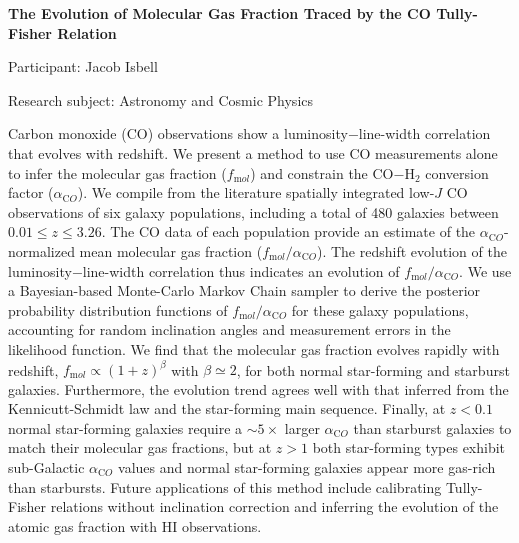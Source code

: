 \begin{minipage}[t]{1.0\textwidth}

\begin{center}

{{\large\bfseries The Evolution of Molecular Gas Fraction Traced by the CO Tully-Fisher Relation}\par}

\end{center}

{\noindent Participant: Jacob Isbell\par} 

{\noindent Research subject: Astronomy and Cosmic Physics\par}\medskip

\noindent Carbon monoxide (CO) observations show a luminosity$-$line-width correlation that evolves with redshift. We present a method to use CO measurements alone to infer the molecular gas fraction ($f_{\mathrm mol}$) and constrain the CO$-$H$_2$ conversion factor ($\alpha_{\mathrm CO}$). We compile from the literature spatially integrated low-$J$ CO observations of six galaxy populations, including a total of 480 galaxies between $0.01 \leq z \leq 3.26$. The CO data of each population provide an estimate of the $\alpha_{\mathrm CO}$-normalized mean molecular gas fraction ($f_{\mathrm mol}/\alpha_{\mathrm CO}$). The redshift evolution of the luminosity$-$line-width correlation thus indicates an evolution of $f_{\mathrm mol}/\alpha_{\mathrm CO}$. We use a Bayesian-based Monte-Carlo Markov Chain sampler to derive the posterior probability distribution functions of $f_{\mathrm mol}/\alpha_{\mathrm CO}$ for these galaxy populations, accounting for random inclination angles and measurement errors in the likelihood function. We find that the molecular gas fraction evolves rapidly with redshift, $f_{\mathrm mol} \propto (1+z)^\beta$ with $\beta \simeq 2$, for both normal star-forming and starburst galaxies. Furthermore, the evolution trend agrees well with that inferred from the Kennicutt-Schmidt law and the star-forming main sequence. Finally, at $z < 0.1$ normal star-forming galaxies require a $\sim5\times$ larger $\alpha_{\mathrm CO}$ than starburst galaxies to match their molecular gas fractions, but at $z > 1$ both star-forming types exhibit sub-Galactic $\alpha_{\mathrm CO}$ values and normal star-forming galaxies appear more gas-rich than starbursts. Future applications of this method include calibrating Tully-Fisher relations without inclination correction and inferring the evolution of the atomic gas fraction with HI observations. \par\end{minipage}

